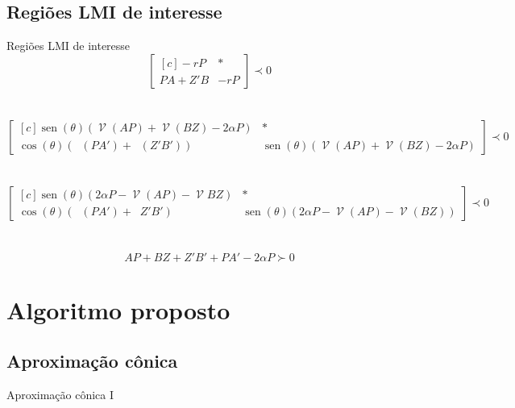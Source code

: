 \documentclass[aspectratio=169,11pt,t,xcolor={usenames,dvipsnames,x11names}]{beamer}
\DeclareMathOperator{\sen}{sen}
\DeclareMathOperator{\Herm}{\mathcal{V}}
\DeclareMathOperator{\herm}{\mathcal{\bar{V}}}
\begin{document}
\subsection{Regiões LMI de interesse}
\begin{frame}{Regiões LMI de interesse}
		\begin{equation}
		  \begin{bmatrix*}[c]
		    -rP       & * \\
		    PA + Z'B  & -rP
		  \end{bmatrix*}
		  \prec 0\label{eq:LMIEstabilidadeRelativa}
		\end{equation}
		\\~\\\pause	
		\begin{equation}
			\begin{bmatrix*}[c]
		    \sen{(\theta)(\Herm{(AP)} + \Herm{(BZ)} -2\alpha P)} &  * \\
		    \cos{(\theta)(\herm{(PA')} + \herm{(Z'B')})}      &  \sen{(\theta)(\Herm{(AP)} + \Herm{(BZ)} -2\alpha P)}
		  \end{bmatrix*}
		  \prec 0\label{eq:LMIESetorConicoEsquerdo}
		\end{equation}
		\\~\\\pause
		\begin{equation}
		  \begin{bmatrix*}[c]
		    \sen{(\theta)(2\alpha P - \Herm{(AP)} - \Herm{BZ})} & * \\
		    \cos{(\theta)(\herm{(PA')} + \herm{Z'B'})}       & \sen{(\theta)(2\alpha P - \Herm{(AP)} - \Herm{(BZ)})}
		  \end{bmatrix*}
		  \prec 0\label{eq:LMIESetorConicoDireito}
		\end{equation}
		\\~\\\pause
		\begin{equation}
	  		AP + BZ + Z'B' + PA' -2\alpha P\label{eq:LMIRightBounded} \succ 0
		\end{equation}
\end{frame}

\section{Algoritmo proposto}
\subsection{Aproximação cônica}
\begin{frame}[c]{Aproximação cônica I}
	\begin{figure}[!ht]
		\centering
		\begin{subfigure}[t]{0.45\columnwidth}
				
		\end{subfigure}
		\begin{subfigure}[t]{0.45\columnwidth}
				
		\end{subfigure}
	\end{figure}
\end{frame}
\end{document}
